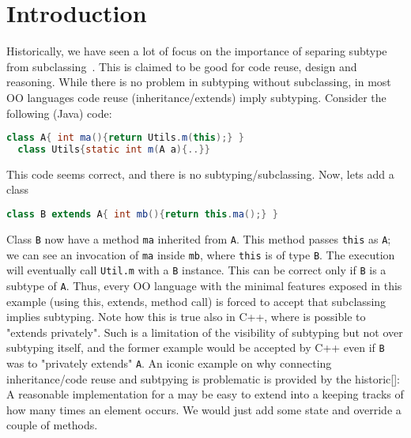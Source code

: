 \section{Introduction}

Historically, we have seen a lot of focus on the importance of
separing subtype from subclassing~\cite{cook}.  This is claimed to be
good for code reuse, design and reasoning.  While there is no problem
in subtyping without subclassing, in most OO languages code reuse
(inheritance/extends) imply subtyping.  Consider the following (Java)
code:

\begin{lstlisting}[language=Java]
  class A{ int ma(){return Utils.m(this);} }
  class Utils{static int m(A a){..}}
\end{lstlisting}

This code seems correct, and there is no subtyping/subclassing.
Now, lets add a class \Q@B@

\begin{lstlisting}[language=Java]
  class B extends A{ int mb(){return this.ma();} }
\end{lstlisting}

Class \lstinline{B} now have a method \lstinline{ma} inherited from \lstinline{A}.
This method passes \lstinline{this} as \lstinline{A}; we can see an invocation of \lstinline{ma}
inside \lstinline{mb}, where \lstinline{this} is of type \lstinline{B}.
The execution will eventually call \lstinline{Util.m} with a \lstinline{B} instance.
This can be correct only if \lstinline{B} is a subtype of \lstinline{A}.
Thus, every OO language with the minimal features 
exposed in this example (using this, extends, method call)
is forced to accept that subclassing implies subtyping.
Note how this is true also in C++, where is possible to
"extends privately". Such is a limitation of the visibility of
subtyping but not over subtyping itself, and the former example
would be accepted by C++ even if \lstinline{B} was to "privately extends" \lstinline{A}.
An iconic example on why connecting inheritance/code reuse and subtpying is problematic is
provided by the historic[]:
A reasonable implementation for a \Q@Set@ may be easy to extend into a \Q@Bag@ keeping tracks of how many times an element occurs.
We would just add some state and override a couple of methods.

